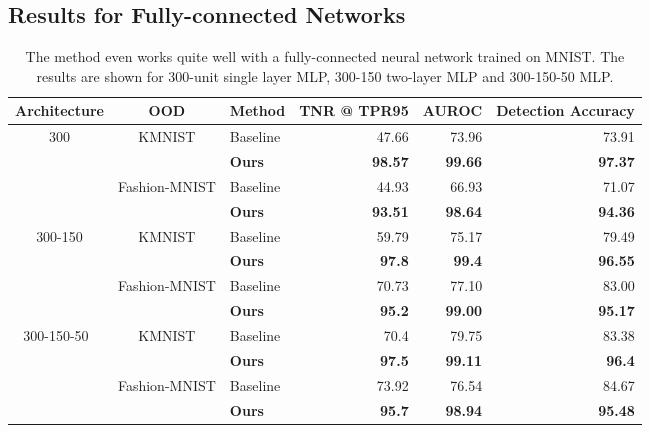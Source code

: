 \documentclass{article}
\begin{document}
\subsection{Results for Fully-connected Networks}
\label{appendix:mlp_results}
\begin{table}[H]
\centering
\begin{tabular}{|c|clrrr|}
\hline
\textbf{Architecture} & \textbf{OOD} & \multicolumn{1}{c}{\textbf{Method}} & \multicolumn{1}{c}{\textbf{TNR @ TPR95}} & \multicolumn{1}{l}{\textbf{AUROC}} & \multicolumn{1}{l|}{\textbf{Detection Accuracy}}
\\
\hline
\multirow{4}{*}{300} & \multirow{2}{*}{KMNIST} & Baseline & 47.66 & 73.96 & 73.91
\\ & & \textbf{Ours} & \textbf{98.57} & \textbf{99.66} & \textbf{97.37}
\\
\cline{2-6} & \multirow{2}{*}{Fashion-MNIST} & Baseline & 44.93 & 66.93 & 71.07
\\ & & \textbf{Ours} & \textbf{93.51} & \textbf{98.64} & \textbf{94.36}
\\
\hline
\multirow{4}{*}{300-150} & \multirow{2}{*}{KMNIST} & Baseline & 59.79 & 75.17 & 79.49
\\ & & \textbf{Ours} & \textbf{97.8} & \textbf{99.4} & \textbf{96.55}
\\
\cline{2-6} & \multirow{2}{*}{Fashion-MNIST} & Baseline & 70.73 & 77.10 & 83.00
\\ & & \textbf{Ours} & \textbf{95.2} & \textbf{99.00} & \textbf{95.17}
\\
\hline
\multirow{4}{*}{300-150-50~} & \multirow{2}{*}{KMNIST} & Baseline & 70.4 & 79.75 & 83.38
\\ & & \textbf{Ours} & \textbf{97.5} & \textbf{99.11} & \textbf{96.4}
\\
\cline{2-6} & \multirow{2}{*}{Fashion-MNIST} & Baseline & 73.92 & 76.54 & 84.67
\\ & & \textbf{Ours} & \textbf{95.7} & \textbf{98.94} & \textbf{95.48}
\\
\hline
\end{tabular}
\caption{The method even works quite well with a fully-connected neural network trained on MNIST. The results are shown for 300-unit single layer MLP, 300-150 two-layer MLP and 300-150-50 MLP.}
\label{fig:mnist_ood}
\end{table}
\end{document}
